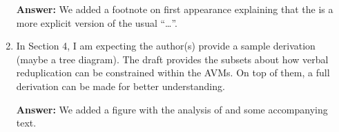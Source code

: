 \documentclass[fleqn,twoside]{article}
\begin{document}
\begin{enumerate}
\noindent
\textbf{Answer: } We added a footnote on first appearance explaining that the \etag is a more
explicit version of the usual ``\ldots''.


\item
In Section 4, I am expecting the author(s) provide a sample derivation (maybe a tree diagram). The draft provides the subsets about how verbal reduplication can be constrained within the AVMs. On top of them, a full derivation can be made for better understanding.

\noindent
\textbf{Answer: } We added a figure with the analysis of  and some
accompanying text.

\end{enumerate}

{\sloppy
\printbibliography[heading=subbibliography,notkeyword=this]
}
\end{document}
